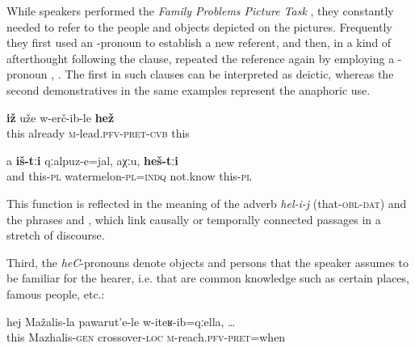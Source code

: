 While speakers performed the \textit{Family Problems Picture Task} \citep{SanRoqueEtAl2012}, they constantly needed to refer to the people and objects depicted on the pictures. Frequently they first used an -pronoun to establish a new referent, and then, in a kind of afterthought following the clause, repeated the reference again by employing a -pronoun , . The first  in such clauses can be interpreted as deictic, whereas the second demonstratives in the same examples represent the anaphoric use.  
%
\begin{exe}
	\ex	\label{They already carried him away}
	\gll	\textbf{iž}	uže	w-erč-ib-le	\textbf{hež} \\
		this	already	\textsc{m}-lead.\textsc{pfv}-\textsc{pret}-\textsc{cvb}	this\\
	\glt	{}
	
	\ex	\label{and these are watermelons, I don't know, these}
	\gll	a	\textbf{iš-tːi}	qːalpuz-e=jal,	aχːu,	\textbf{heš-tːi} \\
		and	this-\textsc{pl}	watermelon-\textsc{pl}=\textsc{indq}	not.know	this-\textsc{pl}\\
	\glt 	{}
\end{exe}


This function is reflected in the meaning of the adverb \textit{hel-i-j} (that-\textsc{obl}-\textsc{dat})  and the phrases   and  , which link causally or temporally connected passages in a stretch of discourse.

Third, the \textit{heC}-pronouns denote objects and persons that the speaker assumes to be familiar for the hearer, i.e. that are common knowledge such as certain places, famous people, etc.:
%
\begin{exe}
	\ex	\label{when I reached the crossover of Mazhalis}
	\gll	hej	Mažalis-la	pawarut'e-le	w-iteʁ-ib=qːella, \ldots\\
		this	Mazhalis-\textsc{gen}	crossover-\textsc{loc}	\textsc{m}-reach.\textsc{pfv}-\textsc{pret}=when\\
	\glt	{}
\end{exe}

